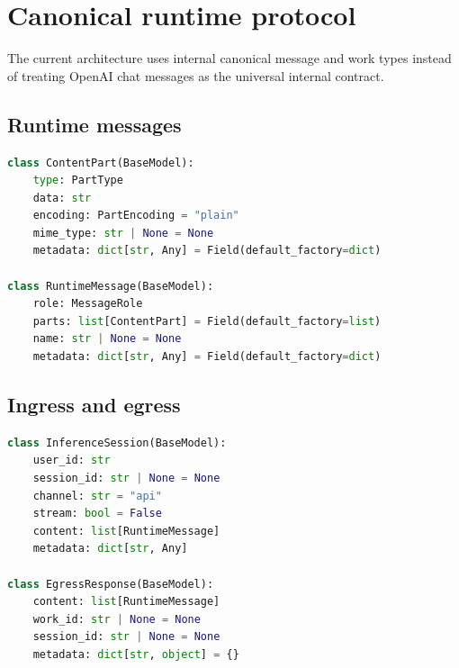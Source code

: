 \documentclass[11pt,a4paper]{article}
\begin{document}
\section{Canonical runtime protocol}
The current architecture uses internal canonical message and work types instead of treating OpenAI chat messages as the universal internal contract.

\subsection{Runtime messages}
\begin{lstlisting}[language=Python]
class ContentPart(BaseModel):
    type: PartType
    data: str
    encoding: PartEncoding = "plain"
    mime_type: str | None = None
    metadata: dict[str, Any] = Field(default_factory=dict)

class RuntimeMessage(BaseModel):
    role: MessageRole
    parts: list[ContentPart] = Field(default_factory=list)
    name: str | None = None
    metadata: dict[str, Any] = Field(default_factory=dict)
\end{lstlisting}

\subsection{Ingress and egress}
\begin{lstlisting}[language=Python]
class InferenceSession(BaseModel):
    user_id: str
    session_id: str | None = None
    channel: str = "api"
    stream: bool = False
    content: list[RuntimeMessage]
    metadata: dict[str, Any]

class EgressResponse(BaseModel):
    content: list[RuntimeMessage]
    work_id: str | None = None
    session_id: str | None = None
    metadata: dict[str, object] = {}
\end{lstlisting}
\end{document}
